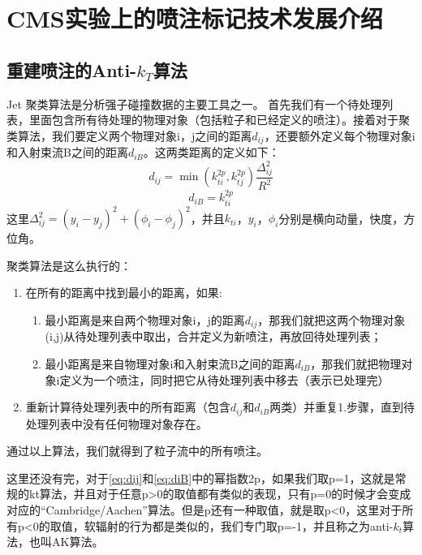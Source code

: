 \chapter{CMS实验上的喷注标记技术发展介绍}
\label{chap3}
\fontsize{12bp}{14.4pt}

\section{重建喷注的Anti-$k_T$算法}
Jet 聚类算法是分析强子碰撞数据的主要工具之一。
首先我们有一个待处理列表，里面包含所有待处理的物理对象（包括粒子和已经定义的喷注）。接着对于聚类算法，我们要定义两个物理对象i，j之间的距离\(d_{ij}\)，还要额外定义每个物理对象i和入射束流B之间的距离$d_{iB}$。这两类距离的定义如下：
\begin{equation}\label{eq:dij}
    d_{ij}=\min(k_{ti}^{2p},k_{tj}^{2p})\frac{\Delta_{ij}^{2}}{R^{2}}
\end{equation}
\begin{equation}\label{eq:diB}
    d_{iB}=k_{ti}^{2p}
\end{equation}
这里$\displaystyle\Delta_{ij}^{2}=(y_{i}-y_{j})^{2}+(\phi_{i}-\phi_{j})^{2}$，并且$k_{ti}$，$y_i$，$\phi_i$分别是横向动量，快度，方位角。%

聚类算法是这么执行的：
\begin{enumerate}
    \item 在所有的距离中找到最小的距离，如果:
    \begin{enumerate}[(1)]
        \item 最小距离是来自两个物理对象i，j的距离$d_{ij}$，那我们就把这两个物理对象(i,j)从待处理列表中取出，合并定义为新喷注，再放回待处理列表；
        \item 最小距离是来自物理对象i和入射束流B之间的距离$d_{iB}$，那我们就把物理对象i定义为一个喷注，同时把它从待处理列表中移去（表示已处理完）
    \end{enumerate}
    \item 重新计算待处理列表中的所有距离（包含$d_{ij}$和$d_{iB}$两类）并重复1.步骤，直到待处理列表中没有任何物理对象存在。
\end{enumerate}
通过以上算法，我们就得到了粒子流中的所有喷注。

这里还没有完，对于\eqref{eq:dij}和\eqref{eq:diB}中的幂指数2p，如果我们取p=1，这就是常规的kt算法，并且对于任意p>0的取值都有类似的表现，只有p=0的时候才会变成对应的“Cambridge/Aachen”算法。但是p还有一种取值，就是取p<0，这里对于所有p<0的取值，软辐射的行为都是类似的，我们专门取p=-1，并且称之为anti-$k_t$算法，也叫AK算法。

